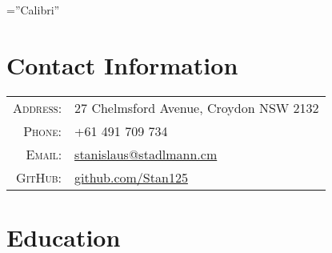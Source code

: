 \documentclass[a4paper,10pt]{article} %
\begin{document}
\pagestyle{empty} %

\font\fb=''Calibri'' %


\par{\bigskip\par} %

\section{Contact Information}

\begin{tabular}{rl}
\textsc{Address:} & 27 Chelmsford Avenue, Croydon NSW 2132\\
\textsc{Phone:} & +61 491 709 734\\
\textsc{Email:} & \href{mailto:stanislaus@stadlmann.cm}{stanislaus@stadlmann.cm} \\
\textsc{GitHub:} & \href{https://github.com/Stan125}{github.com/Stan125}
\end{tabular}


\section{Education}

\end{document}
